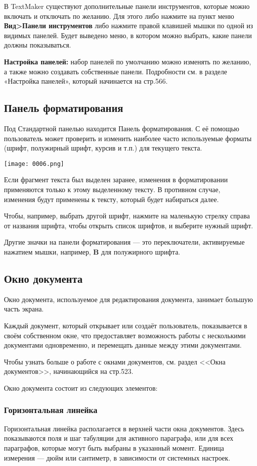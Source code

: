 \documentclass[a4paper,10pt]{article}
\begin{document}
В TextMaker существуют дополнительные панели инструментов, которые можно включать и отключать по желанию. Для этого либо нажмите на пункт меню \textbf{Вид>Панели инструментов} либо нажмите правой клавишей мышки по одной из видимых панелей. Будет выведено меню, в котором можно выбрать, какие панели должны показываться.

\textbf{Настройка панелей:} набор панелей по умолчанию можно изменять по желанию, а также можно создавать собственные панели. Подробности см. в разделе «Настройка панелей», который начинается на стр.566.

\subsection{Панель форматирования}
Под Стандартной панелью находится Панель форматирования. С её помощью пользователь может проверить и изменить наиболее часто используемые форматы (шрифт, полужирный шрифт, курсив и т.п.) для текущего текста.

\texttt{[image: 0006.png]}

Если фрагмент текста был выделен заранее, изменения в форматировании применяются только к этому выделенному тексту. В противном случае, изменения будут применены к тексту, который будет набираться далее.

Чтобы, например, выбрать другой шрифт, нажмите на маленькую стрелку справа от названия шрифта, чтобы открыть список шрифтов, и выберите нужный шрифт.

Другие значки на панели форматирования --- это переключатели, активируемые нажатием мышки, например, \textbf{B} для полужирного шрифта.

\subsection{Окно документа}
Окно документа, используемое для редактирования документа, занимает большую часть экрана.

Каждый документ, который открывает или создаёт пользователь, показывается в своём собственном окне, что предоставляет возможность работы с несколькими документами одновременно, и перемещать данные между этими документами.

Чтобы узнать больше о работе с окнами документов, см. раздел <<Окна документов>>, начинающийся на стр.523.

Окно документа состоит из следующих элементов:

\subsubsection{Горизонтальная линейка}
Горизонтальная линейка располагается в верхней части окна документов. Здесь показываются поля и шаг табуляции для активного параграфа, или для всех параграфов, которые могут быть выбраны в указанный момент. Единица измерения --- дюйм или сантиметр, в зависимости от системных настроек.
\end{document}
